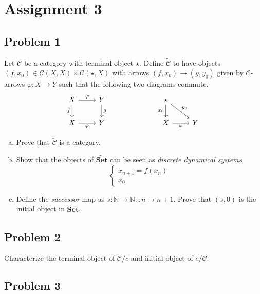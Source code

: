 \documentclass{amsart}
\theoremstyle{remark}
\theoremstyle{definition}
\theoremstyle{definition}
\def\Set{\mathbf{Set}}
\def\mcC{\mathcal{C}}
\def\NN{\mathbb N}
\begin{document}
\section{Assignment 3}

\subsection{Problem 1}

Let $\mcC$ be a category with terminal object $\star$. Define $\widetilde{\mathcal{C}}$ to have objects $(f,x_0)\in\mathcal{C}(X,X)\times\mathcal{C}(\star,X)$ with arrows $(f,x_0)\to(g,y_0)$ given by $\mcC$-arrows $\varphi:X\to Y$ such that the following two diagrams commute.
\[
\begin{tikzcd}
X \arrow[r,"\varphi"] \arrow[d,"f"'] & Y \arrow[d,"g"] & & & \star \arrow[d,"x_0"'] \arrow[dr,"y_0"] & \\ X \arrow[r,"\varphi"'] & Y &&& X \arrow[r,"\varphi"'] & Y  
\end{tikzcd}
\]
\begin{enumerate}[(a)]
    \item Prove that $\widetilde{\mcC}$ is a category.
    
    \item Show that the objects of $\widetilde{\Set}$ can be seen as \emph{discrete dynamical systems}
    \[\begin{cases} x_{n+1} = f(x_n) \\
    x_0 \end{cases}\]
    
    \item Define the \emph{successor} map as $s:\NN\to\NN::n\mapsto n+1$. Prove that $(s,0)$ is the initial object in $\widetilde{\Set}$.
    
\end{enumerate}

\subsection{Problem 2}

Characterize the terminal object of $\mathcal{C}/c$ and initial object of $c/\mathcal{C}$.

\subsection{Problem 3}
\end{document}
